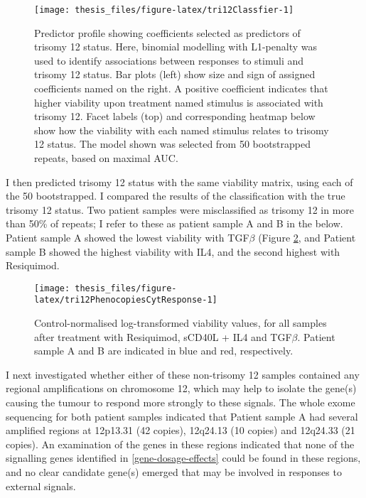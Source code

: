 \documentclass[11pt, a4paper, twosided]{book}
\begin{document}
\begin{figure}

{\centering \texttt{[image: thesis\_files/figure-latex/tri12Classfier-1]} 

}

\caption{Predictor profile showing coefficients selected as predictors of trisomy 12 status. Here, binomial modelling with L1-penalty was used to identify associations between responses to stimuli and trisomy 12 status. Bar plots (left) show size and sign of assigned coefficients named on the right. A positive coefficient indicates that higher viability upon treatment named stimulus is associated with trisomy 12. Facet labels (top) and corresponding heatmap below show how the viability with each named stimulus relates to trisomy 12 status. The model shown was selected from 50 bootstrapped repeats, based on maximal AUC.}\label{fig:tri12Classfier}
\end{figure}
I then predicted trisomy 12 status with the same viability matrix, using each of the 50 bootstrapped. I compared the results of the classification with the true trisomy 12 status. Two patient samples were misclassified as trisomy 12 in more than 50\% of repeats; I refer to these as patient sample A and B in the below. Patient sample A showed the lowest viability with TGF\(\beta\) (Figure \ref{fig:tri12PhenocopiesCytResponse}, and Patient sample B showed the highest viability with IL4, and the second highest with Resiquimod.


\begin{figure}

{\centering \texttt{[image: thesis\_files/figure-latex/tri12PhenocopiesCytResponse-1]} 

}

\caption{Control-normalised log-transformed viability values, for all samples after treatment with Resiquimod, sCD40L + IL4 and TGF\(\beta\). Patient sample A and B are indicated in blue and red, respectively.}\label{fig:tri12PhenocopiesCytResponse}
\end{figure}
I next investigated whether either of these non-trisomy 12 samples contained any regional amplifications on chromosome 12, which may help to isolate the gene(s) causing the tumour to respond more strongly to these signals. The whole exome sequencing for both patient samples indicated that Patient sample A had several amplified regions at 12p13.31 (42 copies), 12q24.13 (10 copies) and 12q24.33 (21 copies). An examination of the genes in these regions indicated that none of the signalling genes identified in \ref{gene-dosage-effects} could be found in these regions, and no clear candidate gene(s) emerged that may be involved in responses to external signals.
\end{document}
